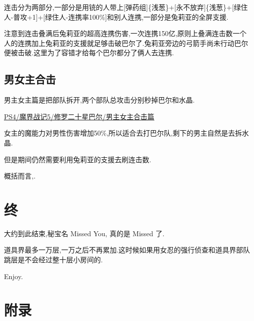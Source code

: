 	连击分为两部分,一部分是用铳的人带上[弹药组]\{浅葱\}+[永不放弃]\{浅葱\}+[绿住人-普攻+1]+[绿住人-连携率100\%]和别人连携,一部分是兔莉亚的全屏支援.

	注意到连击叠满后兔莉亚的超高连携伤害,一次连携150亿,原则上叠满连击数一个人的连携加上兔莉亚的支援就足够击破巴尔了.兔莉亚旁边的弓箭手尚未行动巴尔便被击破.这里为了容错才给每个巴尔都分了俩人去连携.

	\subsection{男女主合击}

	男主女主篇是把部队拆开,两个部队总攻击分别秒掉巴尔和水晶.
	
	\href{http://www.bilibili.com/video/av2995573/}{PS4/魔界战记5/修罗二十星巴尔/男主女主合击篇}

	女主的魔能力对男性伤害增加50\%,所以适合去打巴尔队,剩下的男主自然是去拆水晶.

	但是期间仍然需要利用兔莉亚的支援去刷连击数.

	概括而言,{\color{red}{二十星是利用连击+部队总攻击}}.


	\newpage
	\section{终}

	大约到此结束,秘宝名 Missed You, 真的是 Missed 了.

	道具界最多一万层,一万之后不再累加.这时候如果用女忍的强行侦查和道具界部队跳层是不会经过整十层小房间的.

	Enjoy.

	\newpage
	\section*{附录}

